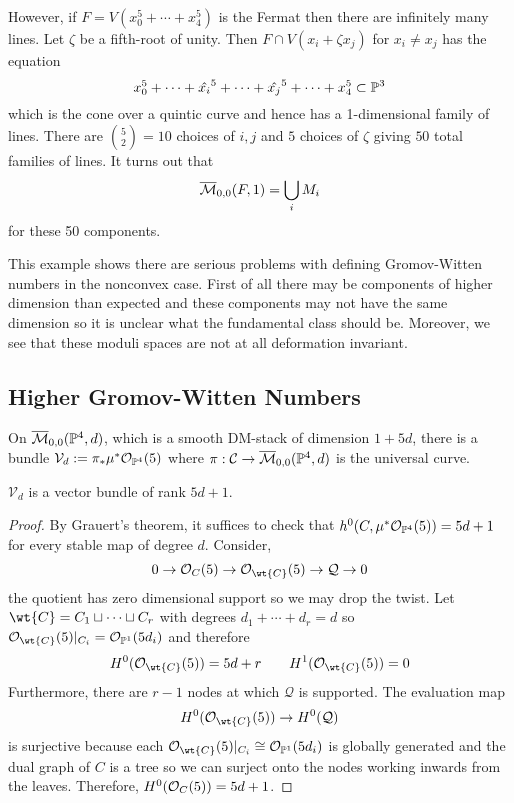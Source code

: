 \documentclass[12pt]{article}
\newcommand{\Mbar}{\ol{\M}}
\begin{document}
\begin{example}
However, if $F = V(x_0^5 + \cdots + x_4^5)$ is the Fermat then there are infinitely many lines. Let $\zeta$ be a fifth-root of unity. Then $F \cap V(x_i + \zeta x_j)$ for $x_i \neq x_j$ has the equation 
\[ x_0^5 + \cdots + \hat{x_i}^5 + \cdots + \hat{x_j}^5 + \cdots + x_4^5 \subset \P^3 \]
which is the cone over a quintic curve and hence has a 1-dimensional family of lines. There are ${5 \choose 2} = 10$ choices of $i,j$ and $5$ choices of $\zeta$ giving $50$ total families of lines. It turns out that
\[ \Mbar_{0,0}(F, 1) = \bigcup_i M_i \]
for these 50 components. 
\end{example}

This example shows there are serious problems with defining Gromov-Witten numbers in the nonconvex case. First of all there may be components of higher dimension than expected and these components may not have the same dimension so it is unclear what the fundamental class should be. Moreover, we see that these moduli spaces are not at all deformation invariant. 

\subsection{Higher Gromov-Witten Numbers}



\newcommand{\cV}{\mathcal{V}}
\newcommand{\cQ}{\mathcal{Q}}
\newcommand{\LL}{\mathbb{L}}

On $\Mbar_{0,0}(\P^4, d)$, which is a smooth DM-stack of dimension $1 + 5d$, there is a bundle $\cV_d := \pi_* \mu^* \struct{\P^4}(5)$ where $\pi : \C \to \Mbar_{0,0}(\P^4, d)$ is the universal curve.

\begin{lemma}
$\cV_d$ is a vector bundle of rank $5d + 1$.
\end{lemma}

\begin{proof}
By Grauert's theorem, it suffices to check that $h^0(C, \mu^* \struct{\P^4}(5)) = 5d + 1$ for every stable map of degree $d$. Consider,
\[ 0 \to \struct{C}(5) \to \struct{\wt{C}}(5) \to \cQ \to 0 \]
the quotient has zero dimensional support so we may drop the twist. Let $\wt{C} = C_1 \sqcup \cdots \sqcup C_r$ with degrees $d_1 + \cdots + d_r = d$ so $\struct{\wt{C}}(5)|_{C_i} = \struct{\P^1}(5d_i)$ and therefore
\[ H^0(\struct{\wt{C}}(5)) = 5 d + r \quad \quad H^1(\struct{\wt{C}}(5)) = 0 \]
Furthermore, there are $r-1$ nodes at which $\cQ$ is supported. The evaluation map
\[ H^0(\struct{\wt{C}}(5)) \to H^0(\cQ) \]
is surjective because each $\struct{\wt{C}}(5)|_{C_i} \cong \struct{\P^1}(5 d_i)$ is globally generated and the dual graph of $C$ is a tree so we can surject onto the nodes working inwards from the leaves. Therefore, $H^0(\struct{C}(5)) = 5d + 1$. 
\end{proof}
\end{document}
